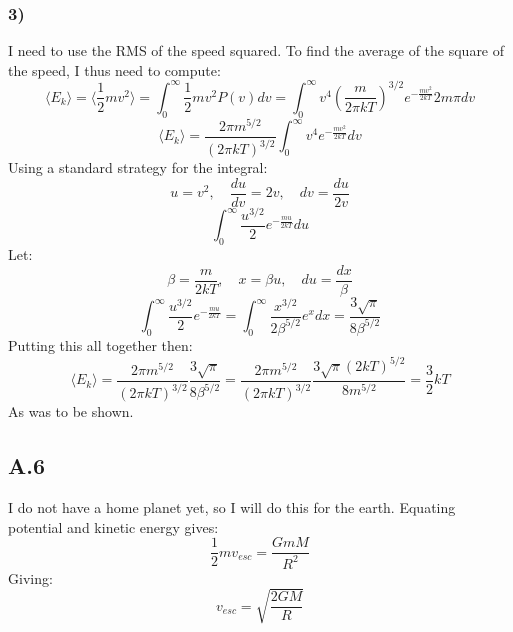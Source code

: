 \documentclass[a4paper,10pt,english]{article}
\begin{document}
\subsubsection*{3)}
I need to use the RMS of the speed squared. To find the average of the square of the speed, I thus need to compute:
$$\langle E_k \rangle=\langle \frac{1}{2}mv^2 \rangle = \int_0^{\infty} \frac{1}{2}mv^2P(v) dv=\int_0^{\infty}v^4\left(\frac{m}{2\pi k T}\right)^{3/2}e^{-\frac{mv^2}{2kT}}2m\pi dv$$
$$\langle E_k \rangle=\frac{2\pi m^{5/2}}{(2\pi k T)^{3/2}}\int_0^{\infty} v^4e^{-\frac{mv^2}{2kT}} dv$$
Using a standard strategy for the integral:
$$u=v^2, \quad \frac{du}{dv}=2v, \quad dv=\frac{du}{2v}$$ 
$$\int_0^{\infty}\frac{u^{3/2}}{2}e^{-\frac{mu}{2kT}}du$$
Let:
$$\beta=\frac{m}{2kT}, \quad x=\beta u, \quad du=\frac{dx}{\beta}$$
$$\int_0^{\infty}\frac{u^{3/2}}{2}e^{-\frac{mu}{2kT}}=\int_0^{\infty}\frac{x^{3/2}}{2\beta^{5/2}}e^x dx=\frac{3\sqrt{\pi}}{8\beta^{5/2}}$$
Putting this all together then:
$$\langle E_k \rangle = \frac{2\pi m^{5/2}}{(2\pi k T)^{3/2}}\frac{3\sqrt{\pi}}{8\beta^{5/2}}= \frac{2\pi m^{5/2}}{(2\pi k T)^{3/2}}\frac{3\sqrt{\pi}(2kT)^{5/2}}{8m^{5/2}}=\frac{3}{2}kT$$
As was to be shown.
\subsection*{A.6}
I do not have a home planet yet, so I will do this for the earth. Equating potential and kinetic energy gives:
$$\frac{1}{2}mv_{esc}=\frac{GmM}{R^2}$$
Giving:
$$v_{esc}=\sqrt{\frac{2GM}{R}}$$
\end{document}
